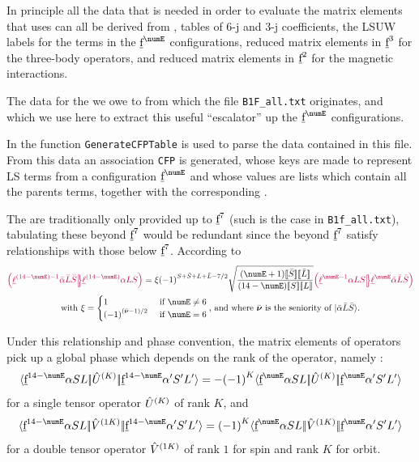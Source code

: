 \documentclass{article}
\newcommand{\codetext}[1]{{\color{BlueViolet} \texttt{#1}}}
\begin{document}
In principle all the data that is needed in order to evaluate the matrix elements that \qlanth uses can all be derived from \cfps, tables of 6-j and 3-j coefficients, the LSUW labels for the terms in the $\forb^{\numE}$ configurations, reduced matrix elements in $\underbar{$\text{f}$}^3$ for the three-body operators, and reduced matrix elements in $\underbar{$\text{f}$}^2$ for the magnetic interactions. 

The data for the \cfps we owe to \cite{velkov_multi-electron_2000} from which the file \codetext{B1F\_all.txt} originates, and which we use here to extract this useful ``escalator'' up the $\forb^{\numE}$ configurations.

In \qlanth the function \codetext{GenerateCFPTable} is used to parse the data contained in this file. From this data an association \codetext{CFP} is generated, whose keys are made to represent LS terms from a configuration $\forb^{\numE}$ and whose values are lists which contain all the parents terms, together with the corresponding \cfps.



The \cfps are traditionally only provided up to $\underbar{$\text{f}$}^7$ (such is the case in \codetext{B1f\_all.txt}), tabulating these beyond $\underbar{$\text{f}$}^7$ would be redundant since the \cfps beyond $\underbar{$\text{f}$}^7$ satisfy relationships with those below $\underbar{$\text{f}$}^7$. According to \cite{nielson_spectroscopic_1963}
\begin{multline}
\cfp{\lorb^{(14 - \numE)-1}\bar{\alpha}\bar{L}\bar{S}}
			{\lorb^{(14-\numE)}\alpha{LS}} =
			\xi
			\phaser{S+\bar{S}+L+\bar{L}-7/2}
			\sqrt{\frac{(\numE+1)\tpobraket{\bar{S}}\tpobraket{{\bar{L}}}}{(14-\numE)\tpobraket{S}\tpobraket{L}}}
			\cfp{\lorb^{\numE-1}\alpha{LS}}
			{\lorb^{\numE}\bar{\alpha}\bar{L}\bar{S}} \\
\text{with }\xi = \begin{cases}
1 & \text{ if }\numE \neq 6 \\
\phaser{(\bar{\senior} - 1)/2} & \text{ if }\numE = 6
\end{cases}	\text{, and where  $\bar{\senior}$ is the seniority of $\ket{\bar{\alpha} \bar{L}\bar{S} }$.}
\end{multline}

Under this relationship and phase convention, the matrix elements of operators pick up a global phase which depends on the rank of the operator, namely \cite{nielson_spectroscopic_1963}:
\begin{equation}
\redbraopket{\forb^{14-\numE}\alpha{SL}}{\op{U}^{(K)}}{\forb^{14-\numE}\alpha'{S'L'}} = -\phaser{K} \redbraopket{\forb^{\numE}\alpha{SL}}{\op{U}^{(K)}}{\forb^{\numE}\alpha'{S'L'}}
\label{eqn:sign change tensor op}
\end{equation}
for a single tensor operator $\hat{U}^{(K)}$ of rank $K$, and
\begin{equation}
\redbraopket{\forb^{14-\numE}\alpha{SL}}{\op{V}^{(1K)}}{\forb^{14-\numE}\alpha'{S'L'}} = \phaser{K} \redbraopket{\forb^{\numE}\alpha{SL}}{\op{V}^{(1K)}}{\forb^{\numE}\alpha'{S'L'}}
\label{eqn:sign change double tensor op}
\end{equation}
for a double tensor operator $\hat{V}^{(1K)}$ of rank $1$ for spin and rank $K$ for orbit.
\end{document}
